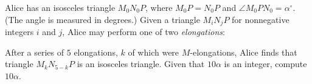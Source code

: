 Alice has an isosceles triangle $M_0N_0P$, where $M_0P=N_0P$ and $\angle M_0PN_0=\alpha^{\circ}$. (The angle is measured in degrees.) Given a triangle $M_iN_jP$ for nonnegative integers $i$ and $j$, Alice may perform one of two \emph{elongations}:

\begin{itemize}


\end{itemize}

After a series of $5$ elongations, $k$ of which were $M$-elongations, Alice finds that triangle $M_kN_{5-k}P$ is an isosceles triangle. Given that $10\alpha$ is an integer, compute $10\alpha$.
